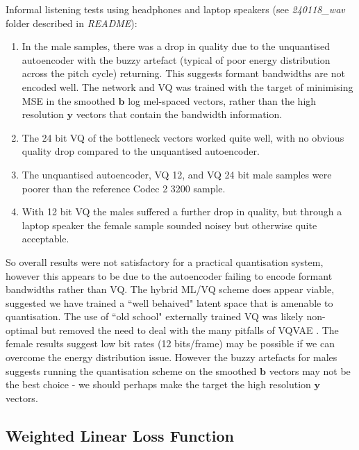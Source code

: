 \documentclass{article}
\begin{document}
Informal listening tests using headphones and laptop speakers (see \emph{240118\_wav} folder described in \emph{README}):
\begin{enumerate}
\item In the male samples, there was a drop in quality due to the unquantised autoencoder with the buzzy artefact (typical of poor energy distribution across the pitch cycle) returning.  This suggests formant bandwidths are not encoded well.  The network and VQ was trained with the target of minimising MSE in the smoothed $\mathbf{b}$ log mel-spaced vectors, rather than the high resolution $\mathbf{y}$ vectors that contain the bandwidth information.
\item The 24 bit VQ of the bottleneck vectors worked quite well, with no obvious quality drop compared to the unquantised autoencoder.
\item The unquantised autoencoder, VQ 12, and VQ 24 bit male samples were poorer than the reference Codec 2 3200 sample.
\item With 12 bit VQ the males suffered a further drop in quality, but through a laptop speaker the female sample sounded noisey but otherwise quite acceptable.
\end{enumerate} 
So overall results were not satisfactory for a practical quantisation system, however this appears to be due to the autoencoder failing to encode formant bandwidths rather than VQ. The hybrid ML/VQ scheme does appear viable, suggested we have trained a ``well behaived" latent space that is amenable to quantisation. The use of ``old school" externally trained VQ was likely non-optimal but removed the need to deal with the many pitfalls of VQVAE \cite{mentzer2023finite}. The female results suggest low bit rates (12 bits/frame) may be possible if we can overcome the energy distribution issue.  However the buzzy artefacts for males suggests running the quantisation scheme on the smoothed $\mathbf{b}$ vectors may not be the best choice - we should perhaps make the target the high resolution $\mathbf{y}$ vectors.

\subsection{Weighted Linear Loss Function}
\end{document}
